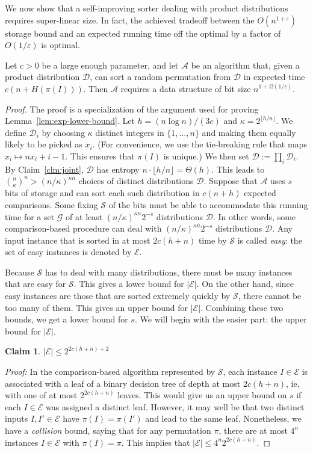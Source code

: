 \documentclass{siamltex}
\newcommand{\cA}{\mathcal{A}}
\newcommand{\D}{\mathcal{D}}
\newcommand{\cE}{\mathcal{E}}
\newcommand{\cG}{\mathcal{G}}
\newcommand{\cS}{\mathcal{S}}
\newcommand{\eps}{\varepsilon}
\newcommand{\eqdef}{:=}
\newtheorem{claim}[theorem]{Claim}
\begin{document}
We now show that a self-improving sorter dealing with product
distributions requires super-linear size.
In fact, the achieved tradeoff between the $O(n^{1+\eps})$ storage bound 
and an expected running time off the optimal by a factor of $O(1/\eps)$ 
is optimal.
\medskip
\begin{lemma}\label{lem:space-lb}
Let $c > 0$ be a large enough parameter, and
let $\cA$ be an algorithm that, given a product 
distribution $\D$, can sort a random permutation from $\D$
in expected time $c(n+H(\pi(I)))$. Then $\cA$ requires 
a data structure of bit size $n^{1+\Omega(1/c)}$.
\end{lemma}

\begin{proof}
The proof is a specialization of the argument used for proving
Lemma~\ref{lem:exp-lower-bound}. Let $h = (n\log n)/(3c)$ and
$\kappa= 2^{\lfloor h/n \rfloor}$.
We define $\D_i$ by choosing $\kappa$ distinct integers in $\{1,\ldots, n\}$
and making them equally likely to be picked as $x_i$.
(For convenience, we use the tie-breaking rule that maps
$x_i\mapsto nx_i +i-1$. This ensures that $\pi(I)$ is unique.) We then 
set $\D \eqdef \prod_i \D_i$. By Claim~\ref{clm:joint}, $\D$ has
entropy $n\cdot \lfloor h/n \rfloor = \Theta(h)$.
This leads to $\binom{n}{\kappa}^n > (n/\kappa)^{\kappa n}$ choices of 
distinct distributions $\D$.
Suppose that $\cA$ uses $s$ bits of storage
and can sort each such distribution in $c(n+h)$ expected comparisons.
Some fixing $\cS$ of the bits must be able to accommodate
this running time for a set $\cG$ of 
at least $(n/\kappa)^{\kappa n}2^{-s}$ distributions $\D$.
In other words, some comparison-based procedure
can deal with $(n/\kappa)^{\kappa n}2^{-s}$ distributions $\D$.
Any input instance that is sorted in at most $2c(h+n)$ time
by $\cS$ is called \emph{easy}: the set of easy
instances is denoted by $\cE$.

Because $\cS$ has to deal with many distributions, there must
be many instances that are easy for $\cS$. This gives
a lower bound for $|\cE|$. On the other hand, 
since easy instances are those that are sorted extremely quickly by $\cS$,
there cannot be too many of them. This gives an upper bound for $|\cE|$.
Combining these two bounds, we get a lower bound for $s$. We will
begin with the easier part: the upper bound for $|\cE|$. 
\begin{claim} \label{clm:E-upper} 
$|{\cE}| \leq  2^{2c(h+n)+2}$
\end{claim} 

\emph{Proof:} 
In the comparison-based algorithm represented by $\cS$, 
each instance $I \in \cE$ is associated with a leaf
of a binary decision tree of depth at most $2c(h+n)$, ie, with one
of at most $2^{2c(h+n)}$ leaves. This would give us an upper bound
on $s$ if each $I \in \cE$ was assigned a distinct leaf.
However, it may well be that two distinct inputs $I, I' \in \cE$ have
$\pi(I) = \pi(I')$ and lead to the same leaf. Nonetheless, we have
a \emph{collision} bound, saying that for any permutation $\pi$,
there are at most $4^n$ instances  $I \in \cE$ with $\pi(I) = \pi$.
This implies that 
$|{\cE}|\leq  4^n2^{2c(h+n)}$.


\end{proof}
\end{document}
